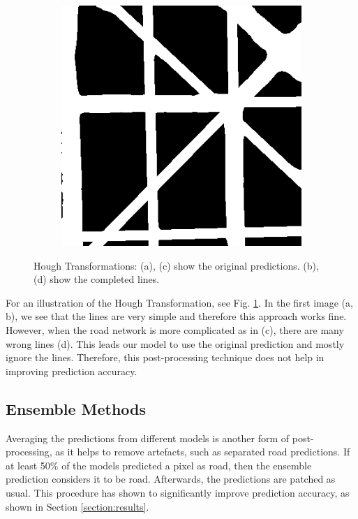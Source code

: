 \begin{figure}[h!]
\begin{subfigure}[b]{0.22\linewidth}
  \end{subfigure}
  \begin{subfigure}[b]{0.22\linewidth}
    \includegraphics[width=\linewidth]{images/satImage_075-lines.png}\caption{}
  \end{subfigure}
    \caption{Hough Transformations: (a), (c) show the original predictions. (b), (d) show the completed lines.
  }
  \label{fig:hough}
\end{figure}

For an illustration of the Hough Transformation, see Fig. \ref{fig:hough}. In the first image (a, b), we see that the lines are very simple and therefore this approach works fine. However, when the road network is more complicated as in (c), there are many wrong lines (d). This leads our model to use the original prediction and mostly ignore the lines. Therefore, this post-processing technique does not help in improving prediction accuracy.


\subsection{Ensemble Methods}

Averaging the predictions from different models is another form of post-processing, as it helps to remove artefacts, such as separated road predictions. If at least 50\% of the models predicted a pixel as road, then the ensemble prediction considers it to be road. Afterwards, the predictions are patched as usual. This procedure has shown to significantly improve prediction accuracy, as shown in Section \ref{section:results}.

